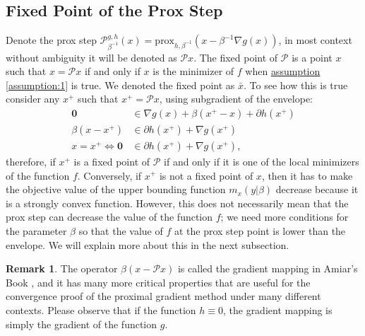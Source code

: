 \documentclass[]{article}
\theoremstyle{definition}
\newtheorem{remark}{Remark}[subsection]
{
    \newtheorem{assumption}{Assumption}
}
\begin{document}
    \subsection{Fixed Point of the Prox Step}\label{sec:fixed_point_prox}
        Denote the prox step $\mathcal P_{\beta^{-1}}^{g, h}(x) = \text{prox}_{h, \beta^{-1}}(x - \beta^{-1}\nabla g(x))$, in most context without ambiguity it will be denoted as $\mathcal Px$. The fixed point of $\mathcal P$ is a point $x$ such that $x = \mathcal P x$ if and only if $x$ is the minimizer of $f$ when \hyperref[assumption:1]{assumption \ref*{assumption:1}} is true. We denoted the fixed point as $\bar x$. To see how this is true consider any $x^+$ such that $x^+ = \mathcal Px$, using subgradient of the envelope: 
        \begin{align*}
            \mathbf 0 
            &\in \nabla g(x) + \beta(x^+ - x) + \partial h(x^+)
            \\
            \beta(x - x^+) &\in \partial h(x^+) + \nabla g(x^+)
            \\
            x = x^+ \iff \mathbf 0 &\in 
            \partial h(x^+) + \nabla g(x^+), 
        \end{align*}
        therefore, if $x^+$ is a fixed point of $\mathcal P$ if and only if it is one of the local minimizers of the function $f$. Conversely, if $x^+$ is not a fixed point of $x$, then it has to make the objective value of the upper bounding function $m_x(y| \beta)$ decrease because it is a strongly convex function. However, this does not necessarily mean that the prox step can decrease the value of the function $f$; we need more conditions for the parameter $\beta$ so that the value of $f$ at the prox step point is lower than the envelope. We will explain more about this in the next subsection. 
        \begin{remark}
            The operator $\beta(x - \mathcal Px)$ is called the gradient mapping in Amiar's Book \cite{book:first_order_opt}, and it has many more critical properties that are useful for the convergence proof of the proximal gradient method under many different contexts. Please observe that if the function $h \equiv 0$, the gradient mapping is simply the gradient of the function $g$. 
        \end{remark}
\end{document}
